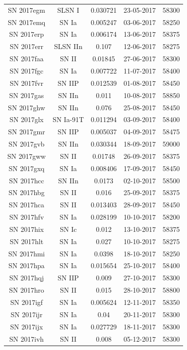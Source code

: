 \documentclass[a4paper,oneside,12pt, class=Latex/Classes/PhDthesisPSnPDF, crop=false]{standalone}
\begin{document}
\begin{longtable}{ccccc}
 SN 2017egm & SLSN I & 0.030721 & 23-05-2017 & 58300 \\
 SN 2017emq & SN Ia & 0.005247 & 03-06-2017 & 58250 \\
 SN 2017erp & SN Ia & 0.006174 & 13-06-2017 & 58375 \\
 SN 2017err & SLSN IIn & 0.107 & 12-06-2017 & 58275 \\
 SN 2017faa & SN II & 0.01845 & 27-06-2017 & 58300 \\
 SN 2017fgc & SN Ia & 0.007722 & 11-07-2017 & 58400 \\
 SN 2017fvr & SN IIP & 0.012539 & 01-08-2017 & 58450 \\
 SN 2017gas & SN IIn & 0.011 & 10-08-2017 & 58850 \\
 SN 2017ghw & SN IIn & 0.076 & 25-08-2017 & 58450 \\
 SN 2017glx & SN Ia-91T & 0.011294 & 03-09-2017 & 58400 \\
 SN 2017gmr & SN IIP & 0.005037 & 04-09-2017 & 58475 \\
 SN 2017gvb & SN IIn & 0.030344 & 18-09-2017 & 59000 \\
 SN 2017gww & SN II & 0.01748 & 26-09-2017 & 58375 \\
 SN 2017gxq & SN Ia & 0.008406 & 17-09-2017 & 58450 \\
 SN 2017hcc & SN IIn & 0.0173 & 02-10-2017 & 58500 \\
 SN 2017hbg & SN II & 0.016 & 25-09-2017 &  58375\\
 SN 2017hca & SN II & 0.013403 & 28-09-2017 & 58450 \\
 SN 2017hfv & SN Ia & 0.028199 & 10-10-2017 & 58200 \\
 SN 2017hix & SN Ic & 0.012 & 13-10-2017 & 58375 \\
 SN 2017hlt & SN Ia & 0.027 & 10-10-2017 & 58275 \\
 SN 2017hmi & SN Ia & 0.0398 & 18-10-2017 & 58250 \\
 SN 2017hpa & SN Ia & 0.015654 & 25-10-2017 & 58400 \\
 SN 2017hqj & SN IIP & 0.009 & 27-10-2017 & 58300 \\
 SN 2017hro & SN II & 0.015 & 28-10-2017 & 58800 \\
 SN 2017igf & SN Ia & 0.005624 & 12-11-2017 & 58350 \\
 SN 2017ijr & SN Ia & 0.04 & 20-11-2017 & 58300 \\
 SN 2017ijx & SN Ia & 0.027729 & 18-11-2017 & 58300 \\
 SN 2017ivh & SN II & 0.008 & 05-12-2017 & 58300 \\

\end{longtable}
\end{document}
